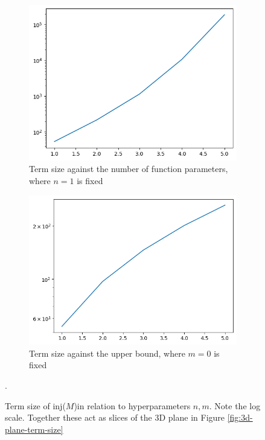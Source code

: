 \documentclass[12pt,a4paper]{report}
\theoremstyle{definition}
\theoremstyle{definition}
\theoremstyle{remark}
\begin{document}
\begin{figure}
\centering
\begin{subfigure}{0.45\textwidth}
  \centering
  \includegraphics[width=\textwidth]{media/inj_term_size_against_type_order.png}
  \caption{Term size against the number of function parameters, where $n=1$ is fixed}
\end{subfigure}%
\hfill
\begin{subfigure}{0.45\textwidth}
  \centering
  \includegraphics[width=\textwidth]{media/inj_term_size_against_upper_bound.png}
  \caption{Term size against the upper bound, where $m=0$ is fixed}
\end{subfigure}
\caption{Term size of inj($M$)in relation to hyperparameters $n,m$. Note the log scale. Together these act as slices of the 3D plane in Figure \ref{fig:3d-plane-term-size}}.
\label{fig:inj-term-size}
\end{figure}
\end{document}
